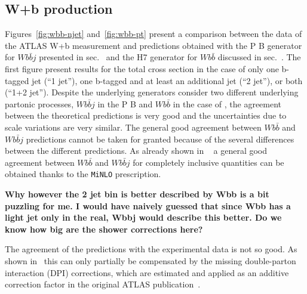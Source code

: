 \documentclass[11pt]{cernrep}
\newcommand{\Herwig}{H\protect\scalebox{0.8}{ERWIG}7\xspace}
\newcommand\MINLO{{\tt MiNLO}}
\newcommand{\POWHEGBOX}{P\protect\scalebox{0.8}{OWHEG} B\protect\scalebox{0.8}{OX}\xspace}
\begin{document}
\subsection{W+b production \label{Wbb}}

Figures~\ref{fig:wbb-njet} and~\ref{fig:wbb-pt} present a comparison
between the data of the ATLAS W+b measurement and predictions obtained
with the \POWHEGBOX{} generator for $Wb\bar{b}j$ presented in
sec.~\label{sec:powheg} and the \Herwig generator for $Wb\bar{b}$
discussed in sec.~\label{subsubsec:herwigsetup}. The first figure
present results for the total cross section in the case of only one
b-tagged jet (``1 jet''), one b-tagged and at least an additional jet
(``2 jet''), or both (``1+2 jet''). Despite the underlying generators
consider two different underlying partonic processes, $Wb\bar{b}j$ in
the \POWHEGBOX{} and $Wb\bar{b}$ in the case of \HERWIG, the agreement
between the theoretical predictions is very good and the uncertainties
due to scale variations are very similar. The general good agreement
between $Wb\bar{b}$ and $Wb\bar{b}j$ predictions cannot be taken for
granted because of the several differences between the different
predictions. As already shown in ~\cite{Luisoni:2015mpa} a general
good agreement between $Wb\bar{b}$ and $Wb\bar{b}j$ for completely
inclusive quantities can be obtained thanks to the \MINLO{}
prescription.

{\bf Why however the 2 jet bin is better described by Wbb is a bit
  puzzling for me. I would have naively guessed that since Wbb has a
  light jet only in the real, Wbbj would describe this better. Do we
  know how big are the shower corrections here?}

The agreement of the predictions with the experimental data is not so
good. As shown in~\cite{Luisoni:2015mpa} this can only partially be
compensated by the missing double-parton interaction (DPI)
corrections, which are estimated and applied as an additive correction
factor in the original ATLAS publication~\cite{Aad:2013vka}.
\end{document}
